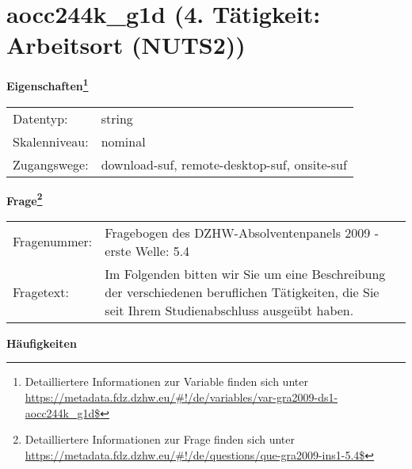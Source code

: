 
    \setcounter{footnote}{0}

    \vspace*{-1.8cm}
	\section{aocc244k\_g1d (4. Tätigkeit: Arbeitsort (NUTS2))}
	\label{section:aocc244k_g1d}



    \vspace*{0.5cm}
    \noindent\textbf{Eigenschaften\footnote{Detailliertere Informationen zur Variable finden sich unter
		\url{https://metadata.fdz.dzhw.eu/\#!/de/variables/var-gra2009-ds1-aocc244k_g1d$}}}\\
	\begin{tabularx}{\hsize}{@{}lX}
	Datentyp: & string \\
	Skalenniveau: & nominal \\
	Zugangswege: &
	  download-suf, 
	  remote-desktop-suf, 
	  onsite-suf
 \\
    \end{tabularx}



				\vspace*{0.5cm}
                \noindent\textbf{Frage\footnote{Detailliertere Informationen zur Frage finden sich unter
		              \url{https://metadata.fdz.dzhw.eu/\#!/de/questions/que-gra2009-ins1-5.4$}}}\\
				\begin{tabularx}{\hsize}{@{}lX}
					Fragenummer: &
					  Fragebogen des DZHW-Absolventenpanels 2009 - erste Welle:
					  5.4
 \\
					Fragetext: & Im Folgenden bitten wir Sie um eine Beschreibung der verschiedenen beruflichen Tätigkeiten, die Sie seit Ihrem Studienabschluss ausgeübt haben. \\
				\end{tabularx}





        		\vspace*{0.5cm}
                \noindent\textbf{Häufigkeiten}

